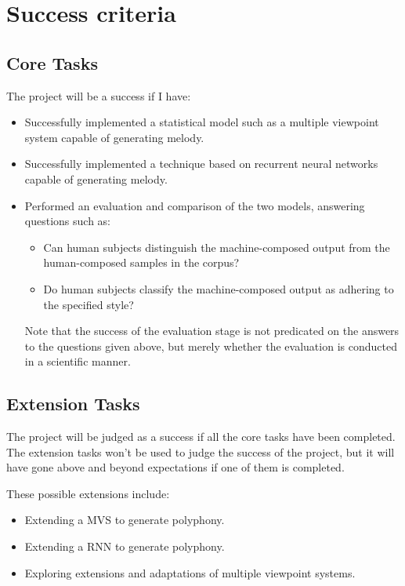 \documentclass[12pt,a4paper,twoside]{article}
\begin{document}
\section*{Success criteria}

\subsection*{Core Tasks}

The project will be a success if I have:
\begin{itemize}
	\item Successfully implemented a statistical model such as a multiple
		viewpoint system capable of generating melody.
	\item Successfully implemented a technique based on recurrent neural
		networks capable of generating melody.
	\item Performed an evaluation and comparison of the two
		models, answering questions such as:
	\begin{itemize}
		\item Can human subjects distinguish the machine-composed output
			from the human-composed samples in the corpus?
		\item Do human subjects classify the machine-composed output as
			adhering to the specified style?
	\end{itemize}

	Note that the success of the evaluation stage is not predicated on the
	answers to the questions given above, but merely whether the evaluation
	is conducted in a scientific manner.
\end{itemize}

\subsection*{Extension Tasks}

The project will be judged as a success if all the core tasks have been
completed. The extension tasks won't be used to judge the success of the
project, but it will have gone above and beyond expectations if one of them is
completed.

These possible extensions include:
\begin{itemize}
	\item Extending a MVS to generate polyphony.
	\item Extending a RNN to generate polyphony.
	\item Exploring extensions and adaptations of multiple viewpoint
		systems.
\end{itemize}
\end{document}
